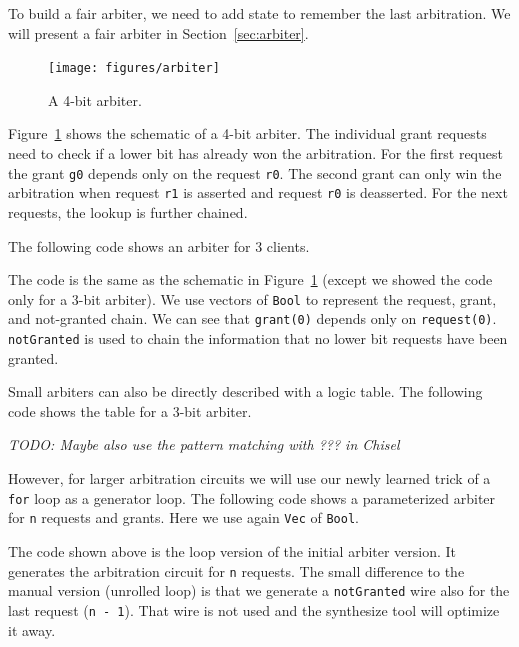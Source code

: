 \documentclass[%
    10pt,
    headinclude, footexclude,
    openright, %
    notitlepage,
    cleardoubleempty,
    headsepline,
    pointlessnumbers,
    bibtotoc, idxtotoc,
    ]{scrbook}
\newcommand{\code}[1]{{\small{\texttt{#1}}}}
\newcommand{\todo}[1]{{\emph{TODO: #1}}}
\begin{document}
To build a fair arbiter, we need to add state to remember the last arbitration.
We will present a fair %
arbiter in Section~\ref{sec:arbiter}.

\begin{figure}
  \centering
  \texttt{[image: figures/arbiter]}
  \caption{A 4-bit arbiter.}
  \label{fig:arbiter}
\end{figure}

Figure~\ref{fig:arbiter} shows the schematic of a 4-bit arbiter.
The individual grant requests need to check if a lower bit has already
won the arbitration. For the first request the grant \code{g0} depends only on the
request \code{r0}. The second grant can only win the arbitration when request \code{r1}
is asserted and request \code{r0} is deasserted. For the next requests, the lookup
is further chained.

The following code shows an arbiter for 3 clients.


\noindent The code is the same as the schematic in Figure~\ref{fig:arbiter}
(except we showed the code only for a 3-bit arbiter).
We use vectors of \code{Bool} to represent the request, grant, and not-granted chain.
We can see that \code{grant(0)} depends only on \code{request(0)}.
\code{notGranted} is used to chain the information that no lower bit requests
have been granted.

Small arbiters can also be directly described with a logic table. The following code
shows the table for a 3-bit arbiter.


\todo{Maybe also use the pattern matching with ??? in Chisel}

However, for larger arbitration circuits we will use our newly learned trick of
a \code{for} loop as a generator loop. The following code shows a parameterized
arbiter for \code{n} requests and grants. Here we use again \code{Vec} of \code{Bool}.


\noindent The code shown above is the loop version of the initial arbiter version.
It generates the arbitration circuit for \code{n} requests. The small difference to the
manual version (unrolled loop) is that we generate a \code{notGranted} wire also for the
last request (\code{n - 1}). That wire is not used and the synthesize tool will optimize it away.
\end{document}
